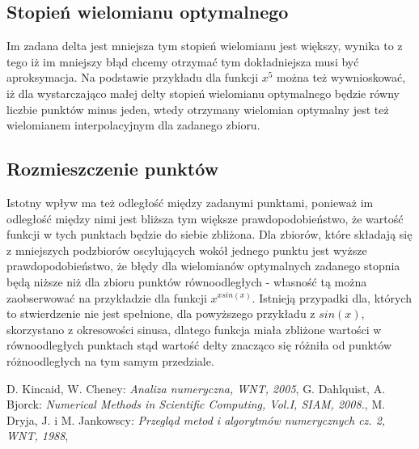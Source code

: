 \documentclass{article}
\begin{document}
\subsection{Stopień wielomianu optymalnego}
Im zadana delta jest mniejsza tym stopień wielomianu jest większy, wynika to z tego iż im mniejszy błąd chcemy otrzymać tym dokładniejsza musi być aproksymacja. Na podstawie przykładu dla funkcji $x^5$ można też wywnioskować, iż dla wystarczająco małej delty stopień wielomianu optymalnego  będzie równy liczbie punktów minus jeden, wtedy otrzymany wielomian optymalny jest też wielomianem interpolacyjnym dla zadanego zbioru.

\subsection{Rozmieszczenie punktów}
Istotny wpływ ma też odległość między zadanymi punktami, ponieważ im odległość między nimi jest bliższa tym większe prawdopodobieństwo, że wartość funkcji w tych punktach będzie do siebie zbliżona. Dla zbiorów, które składają się z mniejszych podzbiorów oscylujących wokół jednego punktu jest wyższe prawdopodobieństwo, że błędy dla wielomianów optymalnych zadanego stopnia będą niższe niż dla zbioru punktów równoodległych - własność tą można zaobserwować na przykładzie dla funkcji $x ^{x sin(x)}$.
Istnieją przypadki dla, których to stwierdzenie nie jest spełnione, dla powyższego przykładu z $sin(x)$, skorzystano z okresowości sinusa, dlatego funkcja miała zbliżone wartości w równoodległych punktach stąd wartość delty znacząco się różniła od punktów różnoodległych na tym samym przedziale.

\begin{thebibliography}{99}
\bibitem{} D. Kincaid, W. Cheney:
\emph{Analiza numeryczna, WNT, 2005},
\bibitem{} G. Dahlquist, A. Bjorck:
\emph{Numerical Methods in Scientific Computing, Vol.I, SIAM, 2008.},
\bibitem{} M. Dryja, J. i M. Jankowscy:
\emph{Przegląd metod i algorytmów numerycznych cz. 2, WNT, 1988},

\end{thebibliography}
\end{document}
